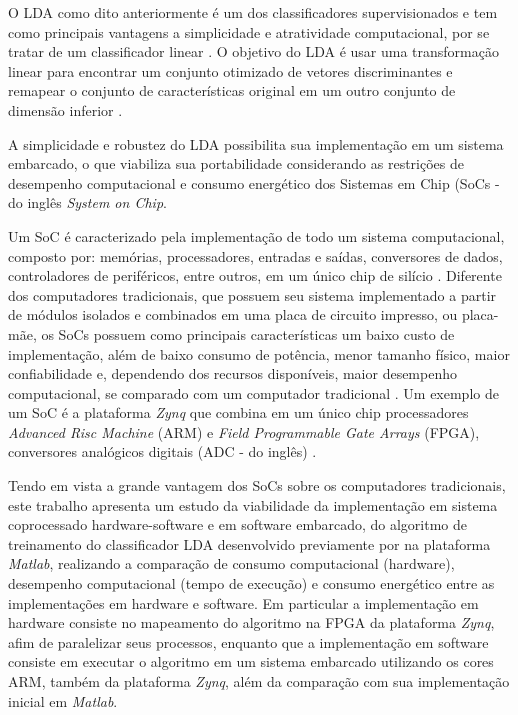 O LDA como dito anteriormente é um dos classificadores supervisionados e tem como principais vantagens a simplicidade e atratividade computacional, por se tratar de um classificador linear \cite{patternRecogn}. O objetivo do LDA é usar uma transformação linear para encontrar um conjunto otimizado de vetores
discriminantes e remapear o conjunto de características original em um outro conjunto de dimensão  inferior \cite{ShashoaLDA}.

A simplicidade e robustez do LDA possibilita sua implementação em um sistema embarcado, o que viabiliza sua portabilidade considerando as restrições de desempenho computacional e consumo energético dos Sistemas em Chip (SoCs - do inglês \textit{System on Chip}.

Um SoC é caracterizado pela implementação de todo um sistema computacional, composto por: memórias, processadores, entradas e saídas, conversores de dados, controladores de periféricos, entre outros, em um único chip de silício \cite{zynqBook}. Diferente dos computadores tradicionais, que possuem seu sistema implementado a partir de módulos isolados e combinados em uma placa de circuito impresso, ou placa-mãe, os SoCs possuem como principais características um baixo custo de implementação, além de baixo consumo de potência, menor tamanho físico, maior confiabilidade e, dependendo dos recursos disponíveis, maior desempenho computacional, se comparado com um computador tradicional \cite{zynqBook}. Um exemplo de um SoC é a plataforma \textit{Zynq} que combina em um único chip processadores \textit{Advanced Risc Machine} (ARM) e \textit{Field Programmable Gate Arrays} (FPGA), conversores analógicos digitais (ADC - do inglês) \cite{zynqBook}. 

Tendo em vista a grande vantagem dos SoCs sobre os computadores tradicionais, este trabalho apresenta um estudo da viabilidade da implementação em sistema coprocessado hardware-software e em software embarcado, do algoritmo de treinamento do classificador LDA desenvolvido previamente por \cite{F.Lotte} na plataforma \textit{Matlab}, realizando a comparação de consumo computacional (hardware), desempenho computacional (tempo de execução) e consumo energético entre as implementações em hardware e software. Em particular a implementação em hardware consiste no mapeamento do algoritmo na FPGA da plataforma \textit{Zynq}, afim de paralelizar seus processos, enquanto que a implementação em software consiste em executar o algoritmo em um sistema embarcado utilizando os cores ARM, também da plataforma \textit{Zynq}, além da comparação com sua implementação inicial em \textit{Matlab}.


